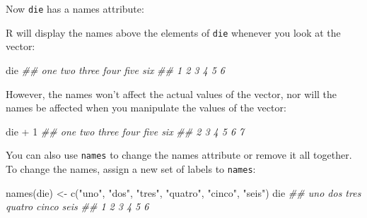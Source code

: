 \documentclass[
  letterpaper,
  DIV=11,
  numbers=noendperiod]{scrbook}
\newenvironment{Shaded}{\begin{snugshade}}{\end{snugshade}}
\newcommand{\DecValTok}[1]{\textcolor[rgb]{0.68,0.00,0.00}{#1}}
\newcommand{\DocumentationTok}[1]{\textcolor[rgb]{0.37,0.37,0.37}{\textit{#1}}}
\newcommand{\FunctionTok}[1]{\textcolor[rgb]{0.28,0.35,0.67}{#1}}
\newcommand{\NormalTok}[1]{\textcolor[rgb]{0.00,0.23,0.31}{#1}}
\newcommand{\OtherTok}[1]{\textcolor[rgb]{0.00,0.23,0.31}{#1}}
\newcommand{\SpecialCharTok}[1]{\textcolor[rgb]{0.37,0.37,0.37}{#1}}
\newcommand{\StringTok}[1]{\textcolor[rgb]{0.13,0.47,0.30}{#1}}
\begin{document}
Now \texttt{die} has a names attribute:

\begin{Shaded}
\end{Shaded}

R will display the names above the elements of \texttt{die} whenever you
look at the vector:

\begin{Shaded}
\begin{Highlighting}[]
\NormalTok{die}
\DocumentationTok{\#\#  one   two three  four  five   six }
\DocumentationTok{\#\#    1     2     3     4     5     6 }
\end{Highlighting}
\end{Shaded}

However, the names won't affect the actual values of the vector, nor
will the names be affected when you manipulate the values of the vector:

\begin{Shaded}
\begin{Highlighting}[]
\NormalTok{die }\SpecialCharTok{+} \DecValTok{1}
\DocumentationTok{\#\#  one   two three  four  five   six }
\DocumentationTok{\#\#    2     3     4     5     6     7}
\end{Highlighting}
\end{Shaded}

You can also use \texttt{names} to change the names attribute or remove
it all together. To change the names, assign a new set of labels to
\texttt{names}:

\begin{Shaded}
\begin{Highlighting}[]
\FunctionTok{names}\NormalTok{(die) }\OtherTok{\textless{}{-}} \FunctionTok{c}\NormalTok{(}\StringTok{"uno"}\NormalTok{, }\StringTok{"dos"}\NormalTok{, }\StringTok{"tres"}\NormalTok{, }\StringTok{"quatro"}\NormalTok{, }\StringTok{"cinco"}\NormalTok{, }\StringTok{"seis"}\NormalTok{)}
\NormalTok{die}
\DocumentationTok{\#\#   uno    dos   tres quatro  cinco   seis }
\DocumentationTok{\#\#     1      2      3      4      5      6 }
\end{Highlighting}
\end{Shaded}
\end{document}

